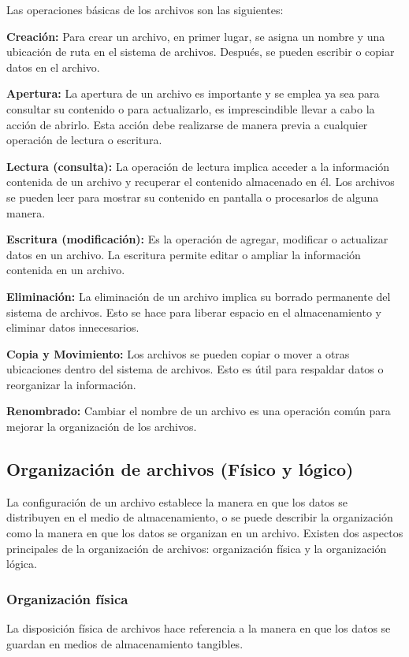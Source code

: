 \documentclass[11pt, twocolumn]{article}
\begin{document}
  Las operaciones básicas de los archivos son las siguientes:

  \textbf{Creación:} Para crear un archivo, en primer lugar, se asigna un nombre y una ubicación de ruta en el sistema de archivos. Después, se pueden escribir o copiar datos en el archivo.

  \textbf{Apertura:} La apertura de un archivo es importante y se emplea ya sea para consultar su contenido o para actualizarlo, es imprescindible llevar a cabo la acción de abrirlo. Esta acción debe realizarse de manera previa a cualquier operación de lectura o escritura.

  \textbf{Lectura (consulta):} La operación de lectura implica acceder a la información contenida de un archivo y recuperar el contenido almacenado en él. Los archivos se pueden leer para mostrar su contenido en pantalla o procesarlos de alguna manera.

  \textbf{Escritura (modificación):} Es la operación de agregar, modificar o actualizar datos en un archivo. La escritura permite editar o ampliar la información contenida en un archivo.

  \textbf{Eliminación:} La eliminación de un archivo implica su borrado permanente del sistema de archivos. Esto se hace para liberar espacio en el almacenamiento y eliminar datos innecesarios.

  \textbf{Copia y Movimiento:} Los archivos se pueden copiar o mover a otras ubicaciones dentro del sistema de archivos. Esto es útil para respaldar datos o reorganizar la información.

  \textbf{Renombrado:} Cambiar el nombre de un archivo es una operación común para mejorar la organización de los archivos.

  \subsection{Organización de archivos (Físico y lógico)}
  La configuración de un archivo establece la manera en que los datos se distribuyen en el medio de almacenamiento, o se puede describir la organización como la manera en que los datos se organizan en un archivo. Existen dos aspectos principales de la organización de archivos: organización física y la organización lógica.

  \subsubsection*{Organización física}
  La disposición física de archivos hace referencia a la manera en que los datos se guardan en medios de almacenamiento tangibles.
\end{document}
